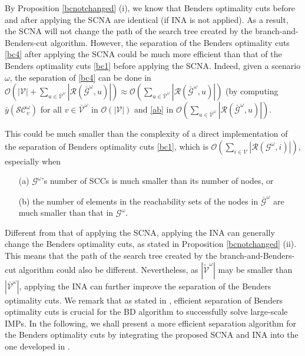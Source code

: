 \documentclass[a4paper,10pt]{article}
\theoremstyle{plain}
\newcommand{\revv}[1]{{#1}}
\begin{document}
{	\revv{By Proposition \ref{bcnotchanged} (i), we know that Benders optimality cuts before and after applying the SCNA are identical (if INA is not applied).
		As a result, the SCNA will not change the path of the search tree created by the branch-and-Benders-cut algorithm.}
	\revv{However, the separation of the Benders optimality cuts \eqref{bc4} after applying the SCNA could be much more efficient than that of the Benders optimality cuts \eqref{bc1} before applying the SCNA.
		Indeed, given a scenario $\omega$, the separation of \eqref{bc4} can be done in $\mathcal{O}(|\mathcal{V}|+\sum_{u \in \bar{\mathcal{V}}^\omega} |\mathcal{R}(\bar{\mathcal{G}}^\omega, u)|)\approx \mathcal{O}(\sum_{u \in \bar{\mathcal{V}}^\omega} |\mathcal{R}(\bar{\mathcal{G}}^\omega, u)|)$ (by computing $\bar{y}(\mathcal{SC}_v^\omega)$ for all $v \in \bar{\mathcal{V}}^\omega$ in $\mathcal{O}(|\mathcal{V}|)$ and \eqref{ab} in $\mathcal{O}(\sum_{u \in \bar{\mathcal{V}}^\omega} |\mathcal{R}(\bar{\mathcal{G}}^\omega, u)|)$.}
	\revv{This could be much smaller than the complexity of a direct implementation of the separation of Benders optimality cuts \eqref{bc1}, which is  $\mathcal{O}(\sum_{i \in {\mathcal{V}}} |\mathcal{R}({\mathcal{G}}^\omega, i)|)$, especially when
		\begin{itemize}
			\item [(a)] $\mathcal{G}^\omega$'s number of SCCs is much smaller than its number of nodes, or
			\item [(b)] the number of elements in the reachability sets of the nodes in $\bar{\mathcal{G}}^\omega$ are much smaller than that in $\mathcal{G}^\omega$.
	\end{itemize}}%
	\revv{\noindent Different from that of applying the SCNA, applying the INA can generally change the Benders optimality cuts, as stated in Proposition \ref{bcnotchanged} (ii).
		This means that the path of the search tree created by the branch-and-Benders-cut algorithm could also be different.
		Nevertheless, as $|\tilde{\mathcal{V}}^\omega|$ may be smaller than  $|\bar{\mathcal{V}}^\omega|$, applying the INA can further improve the separation of the Benders optimality cuts.}
	\revv{We remark that as stated in \cite{Guney2020}, efficient separation of Benders optimality cuts is crucial for the BD algorithm to successfully solve large-scale IMPs.
		In the following, we shall present a more efficient separation algorithm for the Benders optimality cuts by integrating the proposed SCNA and INA into the one developed in \cite{Guney2020}.}
	
	
	
}
\end{document}
